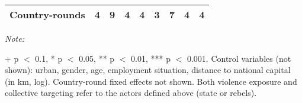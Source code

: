 \begin{table}[!h]
{\begin{threeparttable}
\begin{tabular}[t]{lcccccccc}
Country-rounds & 4 & 9 & 4 & 4 & 3 & 7 & 4 & 4\\
\bottomrule
\end{tabular}
\begin{tablenotes}[para]
\item \textit{Note: } 
\item + p $<$ 0.1, * p $<$ 0.05, ** p $<$ 0.01, *** p $<$ 0.001. Control variables (not shown): urban, gender, age, employment situation, distance to national capital (in km, log). Country-round fixed effects not shown. Both violence exposure and collective targeting refer to the actors defined above (state or rebels).
\end{tablenotes}
\end{threeparttable}}
\end{table}
